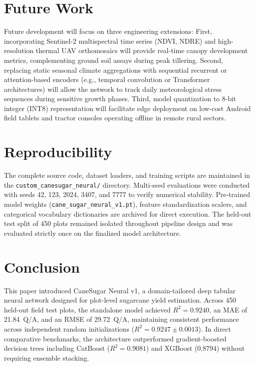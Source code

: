 \documentclass[conference,10pt,letterpaper]{IEEEtran}
\begin{document}
\section{Future Work}

Future development will focus on three engineering extensions:
First, incorporating Sentinel-2 multispectral time series (NDVI, NDRE) and high-resolution thermal UAV orthomosaics will provide real-time canopy development metrics, complementing ground soil assays during peak tillering.
Second, replacing static seasonal climate aggregations with sequential recurrent or attention-based encoders (e.g., temporal convolution or Transformer architectures) will allow the network to track daily meteorological stress sequences during sensitive growth phases.
Third, model quantization to 8-bit integer (INT8) representation will facilitate edge deployment on low-cost Android field tablets and tractor consoles operating offline in remote rural sectors.

\section{Reproducibility}

The complete source code, dataset loaders, and training scripts are maintained in the \texttt{custom\_canesugar\_neural/} directory. Multi-seed evaluations were conducted with seeds 42, 123, 2024, 3407, and 7777 to verify numerical stability. Pre-trained model weights (\texttt{cane\_sugar\_neural\_v1.pt}), feature standardization scalers, and categorical vocabulary dictionaries are archived for direct execution. The held-out test split of 450 plots remained isolated throughout pipeline design and was evaluated strictly once on the finalized model architecture.

\section{Conclusion}

This paper introduced CaneSugar Neural v1, a domain-tailored deep tabular neural network designed for plot-level sugarcane yield estimation. Across 450 held-out field test plots, the standalone model achieved $R^2 = 0.9240$, an MAE of 21.84~Q/A, and an RMSE of 29.72~Q/A, maintaining consistent performance across independent random initializations ($R^2 = 0.9247 \pm 0.0013$). In direct comparative benchmarks, the architecture outperformed gradient-boosted decision trees including CatBoost ($R^2 = 0.9081$) and XGBoost ($0.8794$) without requiring ensemble stacking.
\end{document}
